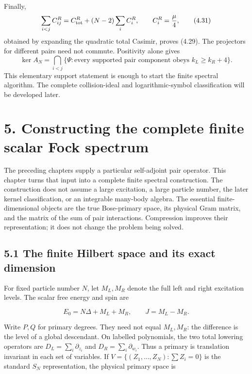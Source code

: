 Finally, \[
\sum_{i<j}C_{ij}^R
=C_{\rm tot}^R+(N-2)\sum_iC_i^R,\qquad
C_i^R=\frac{\mu}{4},
\tag{4.31}
\] obtained by expanding the quadratic total Casimir, proves (4.29). The projectors for different pairs need not commute. Positivity alone gives \[
\ker A_N
=\bigcap_{i<j}
\{\Psi:\text{every supported pair component obeys }k_L\ge k_R+4\}.
\tag{4.32}
\] This elementary support statement is enough to start the finite spectral algorithm. The complete collision-ideal and logarithmic-symbol classification will be developed later.

\clearpage
\hypertarget{constructing-the-complete-finite-scalar-fock-spectrum}{%
\section{5. Constructing the complete finite scalar Fock spectrum}\label{constructing-the-complete-finite-scalar-fock-spectrum}}

The preceding chapters supply a particular self-adjoint pair operator. This chapter turns that input into a complete finite spectral construction. The construction does not assume a large excitation, a large particle number, the later kernel classification, or an integrable many-body algebra. The essential finite-dimensional objects are the true Bose-primary space, its physical Gram matrix, and the matrix of the sum of pair interactions. Compression improves their representation; it does not change the problem being solved.

\hypertarget{the-finite-hilbert-space-and-its-exact-dimension}{%
\subsection{5.1 The finite Hilbert space and its exact dimension}\label{the-finite-hilbert-space-and-its-exact-dimension}}

For fixed particle number \(N\), let \(M_L,M_R\) denote the full left and right excitation levels. The scalar free energy and spin are

\[
E_0=N\Delta+M_L+M_R,\qquad J=M_L-M_R.
\tag{5.1}
\]

Write \(P,Q\) for primary degrees. They need not equal \(M_L,M_R\): the difference is the level of a global descendant. On labelled polynomials, the two total lowering operators are \(D_L=\sum_i\partial_{z_i}\) and \(D_R=\sum_i\partial_{w_i}\). Thus a primary is translation invariant in each set of variables. If \(V=\{(Z_1,\ldots,Z_N):\sum Z_i=0\}\) is the standard \(S_N\) representation, the physical primary space is

